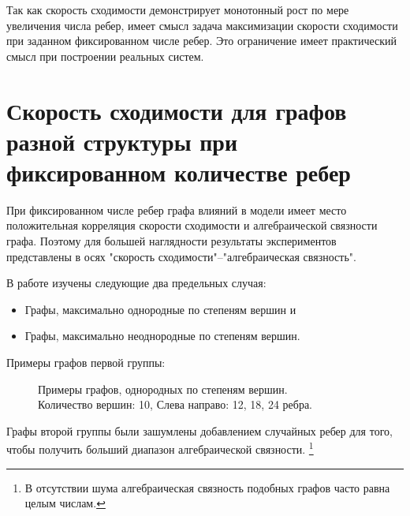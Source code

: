 Так как скорость сходимости демонстрирует монотонный рост по мере увеличения числа ребер, имеет смысл задача максимизации скорости сходимости при заданном фиксированном числе ребер. Это ограничение имеет практический смысл при построении реальных систем.

\section{Скорость сходимости для графов разной структуры при фиксированном количестве ребер}

При фиксированном числе ребер графа влияний в модели имеет место положительная корреляция скорости сходимости и алгебраической связности графа. Поэтому для большей наглядности результаты экспериментов представлены в осях "скорость сходимости"--"алгебраическая связность".

В работе изучены следующие два предельных случая: 
\begin{itemize}
\item Графы, максимально однородные по степеням вершин и
\item Графы, максимально неоднородные по степеням вершин.
\end{itemize}

Примеры графов первой группы:

\begin{figure}[!h]
  \begin{minipage}[h]{0.29\linewidth}
  \end{minipage}
  \hfill
  \begin{minipage}[h]{0.29\linewidth}
  \end{minipage}
  \hfill
  \begin{minipage}[h]{0.29\linewidth}
  \end{minipage}
  \caption{Примеры графов, однородных по степеням вершин. \\ Количество вершин: 10, Слева направо: 12, 18, 24 ребра.}
  \label{img:graphs-uniform}  
\end{figure}

Графы второй группы были зашумлены добавлением случайных ребер для того, чтобы получить б\emph{о}льший диапазон алгебраической связности. \footnote{В отсутствии шума алгебраическая связность подобных графов часто равна целым числам.}

